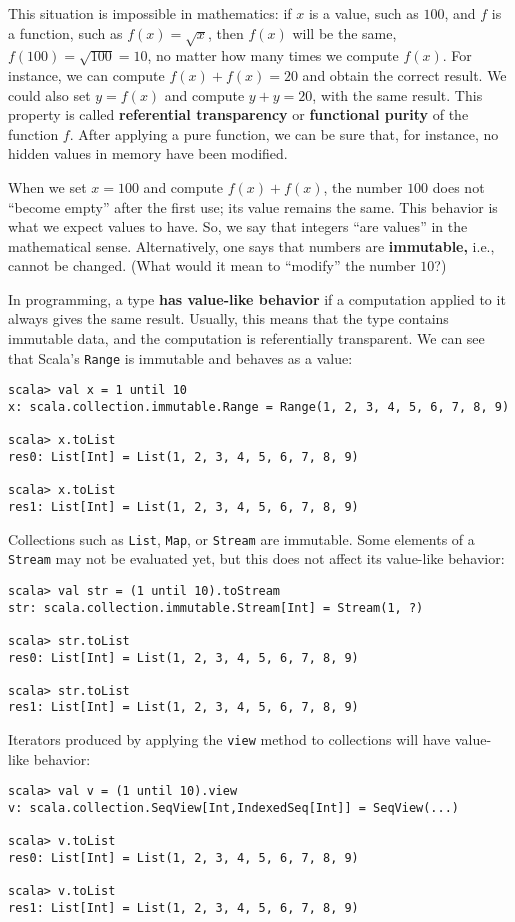 This situation is impossible in mathematics: if $x$ is a value, such
as $100$, and $f$ is a function, such as $f(x)=\sqrt{x}$, then
$f(x)$ will be the same, $f(100)=\sqrt{100}=10$, no matter how many
times we compute $f(x)$. For instance, we can compute $f(x)+f(x)=20$
and obtain the correct result. We could also set $y=f(x)$ and compute
$y+y=20$, with the same result. This property is called \textbf{referential
transparency} or \textbf{functional purity}
of the function $f$. After applying a pure function, we can be sure
that, for instance, no hidden values in memory have been modified.

When we set $x=100$ and compute $f(x)+f(x)$, the number $100$ does
not \textsf{``}become empty\textsf{''} after the first use; its value remains the
same. This behavior is what we expect values to have. So, we say that
integers \textsf{``}are values\textsf{''} in the mathematical sense. Alternatively,
one says that numbers are \textbf{immutable,}
i.e., cannot be changed. (What would it mean to \textsf{``}modify\textsf{''} the number
$10$?)

In programming, a type \textbf{has value-like behavior} if
a computation applied to it always gives the same result. Usually,
this means that the type contains immutable data, and the computation
is referentially transparent. We can see that Scala\textsf{'}s \lstinline!Range!
is immutable and behaves as a value:
\begin{lstlisting}
scala> val x = 1 until 10
x: scala.collection.immutable.Range = Range(1, 2, 3, 4, 5, 6, 7, 8, 9)

scala> x.toList
res0: List[Int] = List(1, 2, 3, 4, 5, 6, 7, 8, 9)

scala> x.toList
res1: List[Int] = List(1, 2, 3, 4, 5, 6, 7, 8, 9) 
\end{lstlisting}
Collections such as \lstinline!List!, \lstinline!Map!, or \lstinline!Stream!
are immutable. Some elements of a \lstinline!Stream! may not be evaluated
yet, but this does not affect its value-like behavior:
\begin{lstlisting}
scala> val str = (1 until 10).toStream
str: scala.collection.immutable.Stream[Int] = Stream(1, ?)

scala> str.toList
res0: List[Int] = List(1, 2, 3, 4, 5, 6, 7, 8, 9)

scala> str.toList
res1: List[Int] = List(1, 2, 3, 4, 5, 6, 7, 8, 9) 
\end{lstlisting}
Iterators produced by applying the \lstinline!view! method to collections
will have value-like behavior:
\begin{lstlisting}
scala> val v = (1 until 10).view
v: scala.collection.SeqView[Int,IndexedSeq[Int]] = SeqView(...)

scala> v.toList
res0: List[Int] = List(1, 2, 3, 4, 5, 6, 7, 8, 9)

scala> v.toList
res1: List[Int] = List(1, 2, 3, 4, 5, 6, 7, 8, 9)
\end{lstlisting}

